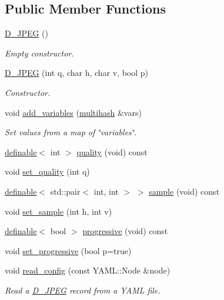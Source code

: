 \subsection*{Public Member Functions}
\begin{DoxyCompactItemize}
\item 
\hyperlink{class_photo_finish_1_1_d___j_p_e_g_a7a8a47f864985558358aa9486af485ae}{D\+\_\+\+J\+P\+EG} ()
\begin{DoxyCompactList}\small\item\em Empty constructor. \end{DoxyCompactList}\item 
\hyperlink{class_photo_finish_1_1_d___j_p_e_g_a94e2ea63fa1e3fd9c6a696eb15f44bf8}{D\+\_\+\+J\+P\+EG} (int q, char h, char v, bool p)
\begin{DoxyCompactList}\small\item\em Constructor. \end{DoxyCompactList}\item 
void \hyperlink{class_photo_finish_1_1_d___j_p_e_g_abdbaf2881b0b7824ac5d30a48d50dee7}{add\+\_\+variables} (\hyperlink{namespace_photo_finish_a6f41796f162687538b7da5c7a95e2d18}{multihash} \&vars)
\begin{DoxyCompactList}\small\item\em Set values from a map of \char`\"{}variables\char`\"{}. \end{DoxyCompactList}\item 
\hyperlink{class_photo_finish_1_1definable}{definable}$<$ int $>$ \hyperlink{class_photo_finish_1_1_d___j_p_e_g_a56ced1254040a8160fe4035e51eee712}{quality} (void) const
\item 
void \hyperlink{class_photo_finish_1_1_d___j_p_e_g_a4312123742612b8793b8b05e7d4c4da9}{set\+\_\+quality} (int q)
\item 
\hyperlink{class_photo_finish_1_1definable}{definable}$<$ std\+::pair$<$ int, int $>$ $>$ \hyperlink{class_photo_finish_1_1_d___j_p_e_g_a240c8b80a7528adf18732bd6acb0558e}{sample} (void) const
\item 
void \hyperlink{class_photo_finish_1_1_d___j_p_e_g_ac5ebc13b15b5d5e88d6f33f5e3074655}{set\+\_\+sample} (int h, int v)
\item 
\hyperlink{class_photo_finish_1_1definable}{definable}$<$ bool $>$ \hyperlink{class_photo_finish_1_1_d___j_p_e_g_a8a0ec88d19e7805e672313fc3af55e34}{progressive} (void) const
\item 
void \hyperlink{class_photo_finish_1_1_d___j_p_e_g_a75bdf3b848842df7e56d0e7cd7bf6c16}{set\+\_\+progressive} (bool p=true)
\item 
void \hyperlink{class_photo_finish_1_1_d___j_p_e_g_ad86821d2da1e25621fb3d21f2ced45be}{read\+\_\+config} (const Y\+A\+M\+L\+::\+Node \&node)
\begin{DoxyCompactList}\small\item\em Read a \hyperlink{class_photo_finish_1_1_d___j_p_e_g}{D\+\_\+\+J\+P\+EG} record from a Y\+A\+ML file. \end{DoxyCompactList}\end{DoxyCompactItemize}
